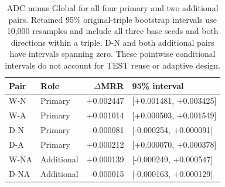 \begin{table}[htbp]
\centering\footnotesize\setlength{\tabcolsep}{3pt}
\caption{ADC minus Global for all four primary and two additional pairs. Retained 95\% original-triple bootstrap intervals use 10,000 resamples and include all three base seeds and both directions within a triple. D-N and both additional pairs have intervals spanning zero. These pointwise conditional intervals do not account for TEST reuse or adaptive design.}
\label{tab:claims-intervals}
\begin{tabular}{llrl}
\toprule
Pair & Role & $\Delta$MRR & 95\% interval\\
\midrule
W-N & Primary & +0.002447 & [+0.001481, +0.003425]\\
W-A & Primary & +0.001014 & [+0.000503, +0.001549]\\
D-N & Primary & -0.000081 & [-0.000254, +0.000091]\\
D-A & Primary & +0.000212 & [+0.000070, +0.000378]\\
W-NA & Additional & +0.000139 & [-0.000249, +0.000547]\\
D-NA & Additional & -0.000015 & [-0.000163, +0.000129]\\
\bottomrule
\end{tabular}
\end{table}
